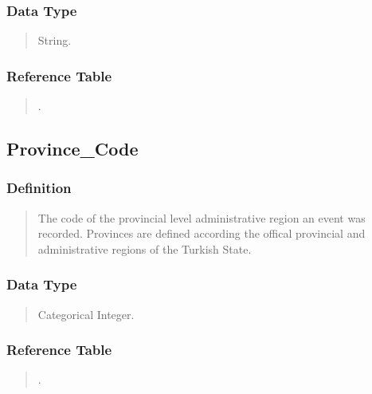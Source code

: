 \documentclass[letterpaper,10pt,english]{sphinxmanual}
\begin{document}
\subsubsection{Data Type}
\label{\detokenize{schema_tables:id32}}\begin{quote}

\sphinxAtStartPar
String.
\end{quote}


\subsubsection{Reference Table}
\label{\detokenize{schema_tables:id33}}\begin{quote}

\sphinxAtStartPar
{\hyperref[\detokenize{schema_tables:province-table}]{}}.
\end{quote}


\subsection{Province\_Code}
\label{\detokenize{schema_tables:province-code}}

\subsubsection{Definition}
\label{\detokenize{schema_tables:id34}}\begin{quote}

\sphinxAtStartPar
The code of the provincial level administrative region an event was recorded.  Provinces are defined according the offical provincial and administrative regions of the Turkish State.
\end{quote}


\subsubsection{Data Type}
\label{\detokenize{schema_tables:id35}}\begin{quote}

\sphinxAtStartPar
Categorical Integer.
\end{quote}


\subsubsection{Reference Table}
\label{\detokenize{schema_tables:id36}}\begin{quote}

\sphinxAtStartPar
{\hyperref[\detokenize{schema_tables:province-table}]{}}.
\end{quote}
\end{document}
